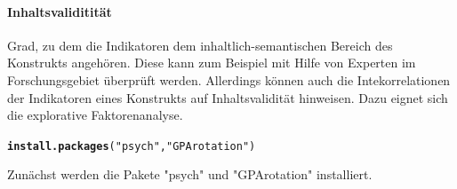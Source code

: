 \documentclass{article}\usepackage[]{graphicx}\usepackage[]{color}
\makeatletter
\newcommand{\hlstr}[1]{\textcolor[rgb]{0.192,0.494,0.8}{#1}}%
\newcommand{\hlstd}[1]{\textcolor[rgb]{0.345,0.345,0.345}{#1}}%
\newcommand{\hlkwd}[1]{\textcolor[rgb]{0.737,0.353,0.396}{\textbf{#1}}}%
\newenvironment{kframe}{%
 \def\at@end@of@kframe{}%
 \ifinner\ifhmode%
  \def\at@end@of@kframe{\end{minipage}}%
  \begin{minipage}{\columnwidth}%
 \fi\fi%
 \def\FrameCommand##1{\hskip\@totalleftmargin \hskip-\fboxsep
 \colorbox{shadecolor}{##1}\hskip-\fboxsep
     \hskip-\linewidth \hskip-\@totalleftmargin \hskip\columnwidth}%
 \MakeFramed {\advance\hsize-\width
   \@totalleftmargin\z@ \linewidth\hsize
   \@setminipage}}%
 {\par\unskip\endMakeFramed%
 \at@end@of@kframe}
\newenvironment{knitrout}{}{} %
\makeatother
\begin{document}
\paragraph{Inhaltsvaliditität} 

Grad, zu dem die Indikatoren dem inhaltlich-semantischen Bereich des Konstrukts angehören. Diese kann zum Beispiel mit Hilfe von Experten im Forschungsgebiet überprüft werden. Allerdings können auch die Intekorrelationen der Indikatoren eines Konstrukts auf Inhaltsvalidität hinweisen.\cite{hildebrandt1984kausalanalytische} Dazu eignet sich die explorative Faktorenanalyse.\cite{vinzi2003pls}\\
\begin{knitrout}
\color{fgcolor}\begin{kframe}
\begin{alltt}
\hlkwd{install.packages}\hlstd{(}\hlstr{"psych"}\hlstd{,}\hlstr{"GPArotation"}\hlstd{)}
\end{alltt}
\end{kframe}
\end{knitrout}
Zunächst werden die Pakete "psych" und "GPArotation" installiert.
\end{document}
